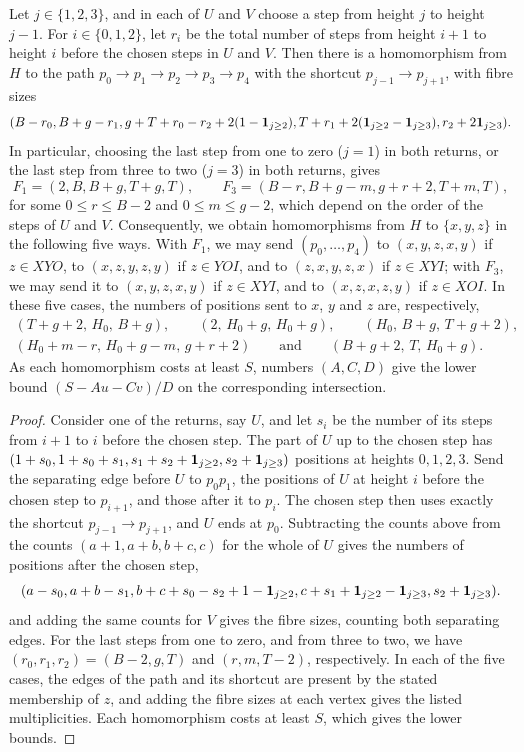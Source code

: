 \begin{lemma}
\label{descent374:full-maps}
\label{descent378:uniform-cyclic}
\label{descent378:first-bottom-cyclic}
Let $j\in\{1,2,3\}$, and in each of $U$ and $V$ choose a step from height $j$ to height $j-1$.
For $i\in\{0,1,2\}$, let $r_i$ be the total number of steps from height $i+1$ to height $i$
before the chosen steps in $U$ and $V$. Then there is a homomorphism from $H$ to the path
$p_0\to p_1\to p_2\to p_3\to p_4$ with the shortcut
$p_{j-1}\to p_{j+1}$, with fibre sizes
\[
 (B-r_0,B+g-r_1,
 g+T+r_0-r_2+2(1-\mathbf 1_{j\ge2}),
 T+r_1+2(\mathbf 1_{j\ge2}-\mathbf 1_{j\ge3}),
 r_2+2\mathbf 1_{j\ge3}).
\]
In particular, choosing the last step from one to zero ($j=1$) in both returns, or the last step from three to two ($j=3$) in both returns, gives
\[
 F_1=(2,B,B+g,T+g,T),\qquad
 F_3=(B-r,B+g-m,g+r+2,T+m,T),
\]
for some $0\le r\le B-2$ and $0\le m\le g-2$, which depend on the order of the steps of $U$ and $V$.
Consequently, we obtain homomorphisms from $H$ to $\{x,y,z\}$ in the following five ways. With $F_1$, we may send $(p_0,\ldots,p_4)$ to $(x,y,z,x,y)$ if $z\in XYO$, to $(x,z,y,z,y)$ if $z\in YOI$, and to $(z,x,y,z,x)$ if $z\in XYI$; with $F_3$, we may send it to $(x,y,z,x,y)$ if $z\in XYI$, and to $(x,z,x,z,y)$ if $z\in XOI$. In these five cases, the numbers of positions sent to $x$, $y$ and $z$ are, respectively,
\[
\begin{gathered}
 (T+g+2,\,H_0,\,B+g),\qquad (2,\,H_0+g,\,H_0+g),\qquad (H_0,\,B+g,\,T+g+2),\\
 (H_0+m-r,\,H_0+g-m,\,g+r+2)\qquad\text{and}\qquad (B+g+2,\,T,\,H_0+g).
\end{gathered}
\]
As each homomorphism costs at least $S$, numbers $(A,C,D)$ give the lower bound $(S-Au-Cv)/D$ on the corresponding intersection.
\end{lemma}
\begin{proof}
Consider one of the returns, say $U$, and let $s_i$ be the number of its steps from $i+1$ to $i$ before the chosen step.
The part of $U$ up to the chosen step has
$(1+s_0,1+s_0+s_1,s_1+s_2+\mathbf 1_{j\ge2},s_2+\mathbf 1_{j\ge3})$ positions at heights $0,1,2,3$.
Send the separating edge before $U$ to $p_0p_1$, the positions of $U$ at height $i$ before the chosen step to
$p_{i+1}$, and those after it to $p_i$. The chosen step then
uses exactly the shortcut $p_{j-1}\to p_{j+1}$, and $U$
ends at $p_0$. Subtracting the counts above from the counts
$(a+1,a+b,b+c,c)$ for the whole of $U$ gives the numbers of positions after the chosen step,
\[
 (a-s_0,a+b-s_1,b+c+s_0-s_2+1-\mathbf 1_{j\ge2},
 c+s_1+\mathbf 1_{j\ge2}-\mathbf 1_{j\ge3},s_2+\mathbf 1_{j\ge3}).
\]
and adding the same counts for $V$ gives the fibre sizes, counting both
separating edges. For the last steps from one to zero, and from three to two, we have
$(r_0,r_1,r_2)=(B-2,g,T)$ and $(r,m,T-2)$, respectively.
In each of the five cases, the edges of the path and its
shortcut are present by the stated membership of $z$,
and adding the fibre sizes at each vertex gives the listed multiplicities. Each homomorphism
costs at least $S$, which gives the lower bounds.
\end{proof}

